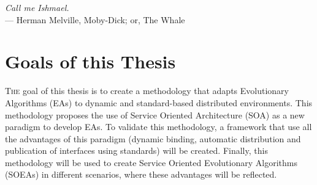 \label{chap:introduction}
\begin{flushright}{\slshape
    Call me Ishmael.} \\ \medskip
    --- {Herman Melville, Moby-Dick; or, The Whale}
\end{flushright}
\minitoc\mtcskip
\vfill



\section{Goals of this Thesis} %


\lettrine{T}{he} goal of this thesis is to create a methodology that adapts Evolutionary Algorithms (EAs) to dynamic and standard-based distributed environments. This methodology proposes the use of Service Oriented Architecture (SOA) as a new paradigm to develop EAs. To validate this methodology, a framework that use all the advantages of this paradigm (dynamic binding, automatic distribution and publication of interfaces using standards) will be created. Finally, this methodology will be used to create Service Oriented Evolutionary Algorithms (SOEAs) in different scenarios, where these advantages will be reflected.

